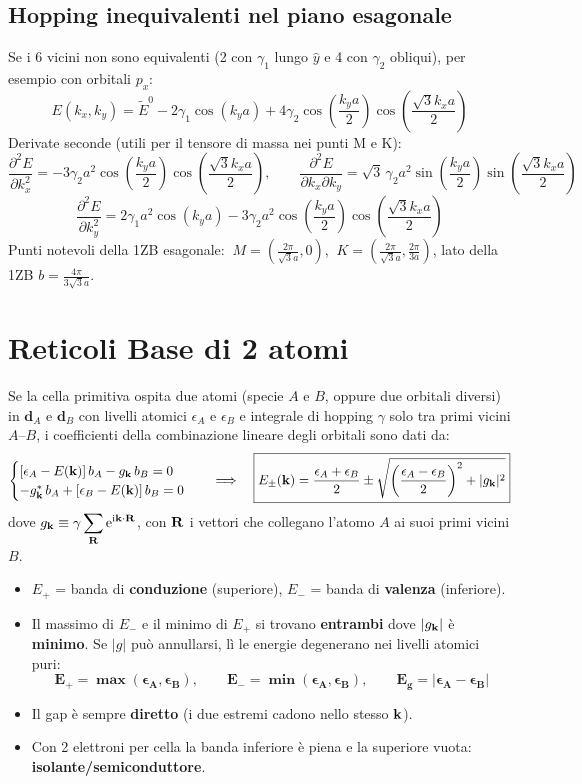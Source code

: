 \subsection{Hopping inequivalenti nel piano esagonale}
Se i 6 vicini non sono equivalenti (2 con $\gamma_1$ lungo $\hat y$ e 4 con $\gamma_2$ obliqui), per esempio con orbitali $p_x$:
\[ E(k_x,k_y) = \tilde E^0 - 2\gamma_1\cos(k_ya) + 4\gamma_2\cos\!\left(\frac{k_ya}{2}\right)\cos\!\left(\frac{\sqrt3 k_xa}{2}\right) \]
Derivate seconde (utili per il tensore di massa nei punti M e K):
\[ \frac{\partial^2E}{\partial k_x^2} = -3\gamma_2a^2\cos\!\left(\frac{k_ya}{2}\right)\cos\!\left(\frac{\sqrt3k_xa}{2}\right),\qquad
   \frac{\partial^2E}{\partial k_x\partial k_y} = \sqrt3\,\gamma_2a^2\sin\!\left(\frac{k_ya}{2}\right)\sin\!\left(\frac{\sqrt3k_xa}{2}\right) \]
\[ \frac{\partial^2E}{\partial k_y^2} = 2\gamma_1a^2\cos(k_ya) - 3\gamma_2a^2\cos\!\left(\frac{k_ya}{2}\right)\cos\!\left(\frac{\sqrt3k_xa}{2}\right) \]
Punti notevoli della 1ZB esagonale: $\ M=\left(\frac{2\pi}{\sqrt3a},0\right)$, $\ K=\left(\frac{2\pi}{\sqrt3a},\frac{2\pi}{3a}\right)$, lato della 1ZB $b=\frac{4\pi}{3\sqrt3 a}$.




\newpage

\section{Reticoli Base di 2 atomi}
Se la cella primitiva ospita due atomi (specie $A$ e $B$, oppure due orbitali diversi) in $\mathbf{d}_A$ e $\mathbf{d}_B$ con livelli atomici $\epsilon_A$ e $\epsilon_B$ e integrale di hopping $\gamma$ solo tra primi vicini $A$--$B$, i coefficienti della combinazione lineare degli orbitali sono dati da:
\[
\begin{cases}
[\epsilon_A - E(\mathbf{k})]\,b_A - g_{\mathbf{k}}\, b_B = 0 \\
-g_{\mathbf{k}}^{*}\, b_A + [\epsilon_B - E(\mathbf{k})]\,b_B = 0
\end{cases}
\quad\Longrightarrow\quad
\boxed{E_\pm(\mathbf{k}) = \frac{\epsilon_A+\epsilon_B}{2} \pm \sqrt{\left(\frac{\epsilon_A-\epsilon_B}{2}\right)^{2} + |g_{\mathbf{k}}|^{2}}}
\]
dove $\displaystyle g_{\mathbf{k}} \equiv \gamma\sum_{\mathbf{R}}\mathrm{e}^{\mathrm{i}\mathbf{k}\cdot\mathbf{R}}$, con $\mathbf{R}$ i vettori che collegano l'atomo $A$ ai suoi primi vicini $B$.
\begin{itemize}
  \item $E_+$ = banda di \textbf{conduzione} (superiore), $E_-$ = banda di \textbf{valenza} (inferiore).
  \item Il massimo di $E_-$ e il minimo di $E_+$ si trovano \textbf{entrambi} dove $|g_{\mathbf{k}}|$ è \textbf{minimo}. Se $|g|$ può annullarsi, lì le energie degenerano nei livelli atomici puri:
  \[ \bm{E_+ = \max(\epsilon_A,\epsilon_B)}, \qquad \bm{E_- = \min(\epsilon_A,\epsilon_B)}, \qquad \bm{E_g = |\epsilon_A-\epsilon_B|} \]
  \item Il gap è sempre \textbf{diretto} (i due estremi cadono nello stesso $\mathbf{k}$).
  \item Con 2 elettroni per cella la banda inferiore è piena e la superiore vuota: \textbf{isolante/semiconduttore}.
\end{itemize}


